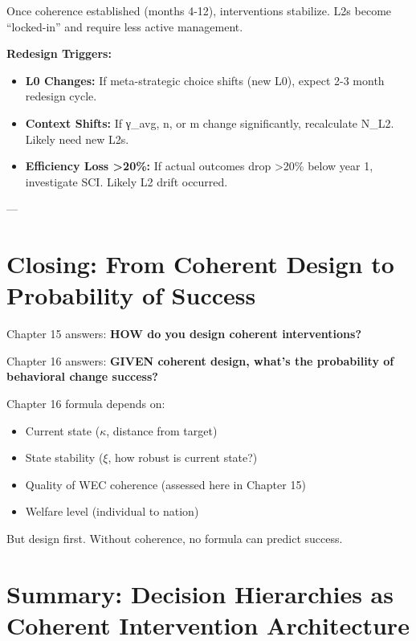 \documentclass[11pt, a4paper]{article}
\begin{document}
Once coherence established (months 4-12), interventions stabilize. L2s become ``locked-in'' and require less active management.

\textbf{Redesign Triggers:}
\begin{itemize}[nosep]
    \item \textbf{L0 Changes:} If meta-strategic choice shifts (new L0), expect 2-3 month redesign cycle.
    \item \textbf{Context Shifts:} If γ_avg, n, or m change significantly, recalculate N_{L2}. Likely need new L2s.
    \item \textbf{Efficiency Loss >20\%:} If actual outcomes drop >20\% below year 1, investigate SCI. Likely L2 drift occurred.
\end{itemize}

---

\section*{Closing: From Coherent Design to Probability of Success}

Chapter 15 answers: \textbf{HOW do you design coherent interventions?}

Chapter 16 answers: \textbf{GIVEN coherent design, what's the probability of behavioral change success?}

Chapter 16 formula depends on:
\begin{itemize}[nosep]
    \item Current state ($\kappa$, distance from target)
    \item State stability ($\xi$, how robust is current state?)
    \item Quality of WEC coherence (assessed here in Chapter 15)
    \item Welfare level (individual to nation)
\end{itemize}

But design first. Without coherence, no formula can predict success.


\section{Summary: Decision Hierarchies as Coherent Intervention Architecture}\label{sec:ch15-summary}
\end{document}

